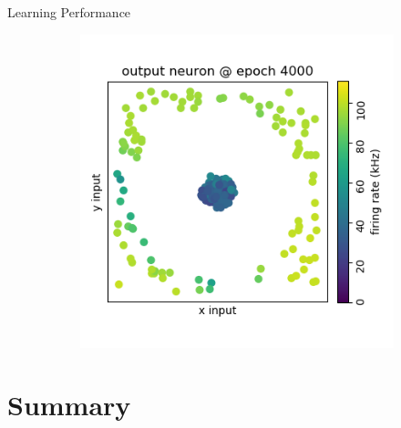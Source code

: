 \documentclass[12pt, aspectratio=169]{beamer}
\begin{document}
\begin{frame}{Learning Performance}
\begin{figure}[!htb]
\begin{figure}
            \includegraphics[scale=0.25]{mfp/output_neuron_4000.png}
            \label{fig:my_label}
        \end{figure}
    \endminipage\hfill
\end{figure}
\end{frame}

\section[Summary]{Summary}
\end{document}
